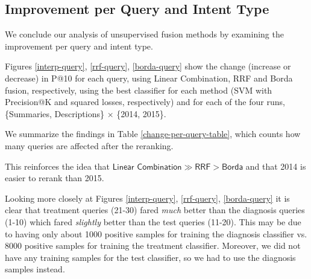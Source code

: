 \subsection{Improvement per Query and Intent Type}
We conclude our analysis of unsupervised fusion methods by examining the improvement per query and intent type.

Figures \ref{interp-query}, \ref{rrf-query}, \ref{borda-query} show the change (increase or decrease) in P@10 for each query,
using Linear Combination, RRF and Borda fusion, respectively, using the best classifier for each method (SVM with
Precision@K and squared losses, respectively) and for each of the four runs, \{Summaries, Descriptions\} $\times$ \{2014, 2015\}.

We summarize the findings in Table \ref{change-per-query-table}, which counts
how many queries are affected after the reranking.

\begin{table}[h!]
\centering
\caption{Number of positively/negatively affected queries for each unsupervised fusion methods, using their best classifier (Tables \ref{interpolation-res}, \ref{rrf-res}
and \ref{borda-res}, respectively).}
\label{change-per-query-table}
\end{table}

This reinforces the idea that $\textsf{Linear Combination} \gg \textsf{RRF} > \textsf{Borda}$
and that 2014 is easier to rerank than 2015.

Looking more closely at Figures \ref{interp-query}, \ref{rrf-query}, \ref{borda-query}
it is clear that
treatment queries (21-30) fared \emph{much} better than the diagnosis queries (1-10)
which fared \emph{slightly} better than the test queries (11-20).
This may be due to having only about 1000 positive samples for training the diagnosis classifier vs. 8000 positive samples
for training the treatment classifier. Moreover, we did not have any training samples for the test classifier,
so we had to use the diagnosis samples instead.

